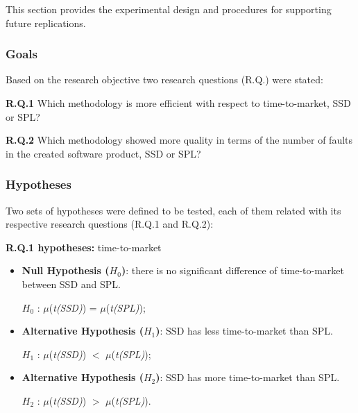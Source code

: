 This section provides the experimental design and procedures for supporting future replications.

\subsubsection{Goals}

Based on the research objective two research questions (R.Q.) were stated:

\textbf{R.Q.1} Which methodology is more efficient with respect to time-to-market, SSD or SPL?

\textbf{R.Q.2} Which methodology showed more quality in terms of the number of faults in the created software product, SSD or SPL?

\subsubsection{Hypotheses}

Two sets of hypotheses were defined to be tested, each of them related with its respective research questions (R.Q.1 and R.Q.2):

\textbf{R.Q.1 hypotheses:} time-to-market

	\begin{itemize}
	
	\item \textbf{Null Hypothesis ($H_{0}$)}: there is no significant difference of time-to-market between SSD and SPL.
	
	$H_{0}$ : $\mu$(\textit{t(SSD)}) =  $\mu$(\textit{t(SPL)});
	
	\item \textbf{Alternative Hypothesis ($H_{1}$)}: SSD has less time-to-market than SPL.
	
	$H_{1}$ : $\mu$(\textit{t(SSD)}) $<$ $\mu$(\textit{t(SPL)});
		
	
	\item \textbf{Alternative Hypothesis ($H_{2}$)}: SSD has more time-to-market than SPL.
	
	$H_{2}$ :  $\mu$(\textit{t(SSD)}) $>$ $\mu$(\textit{t(SPL)}).		
	
	\end{itemize}	

